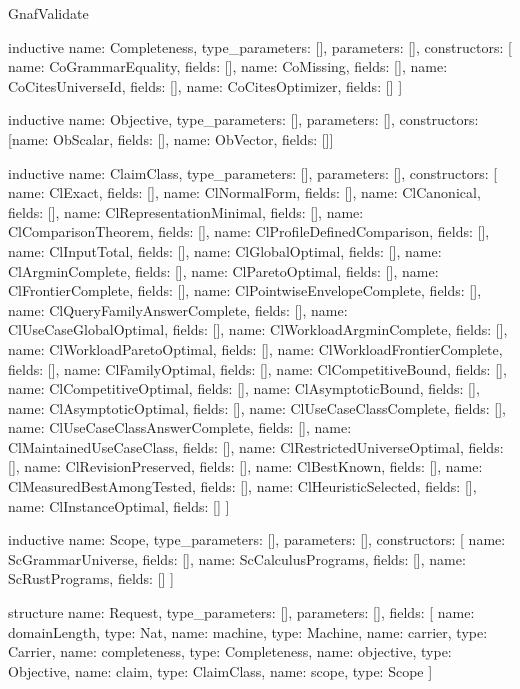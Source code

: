 \begin{lexlean}{GnafValidate}
\begin{semanticmodule}
inductive{
  name: Completeness,
  type_parameters: [],
  parameters: [],
  constructors: [
    {name: CoGrammarEquality, fields: []},
    {name: CoMissing, fields: []},
    {name: CoCitesUniverseId, fields: []},
    {name: CoCitesOptimizer, fields: []}
  ]
}

inductive{
  name: Objective,
  type_parameters: [],
  parameters: [],
  constructors: [{name: ObScalar, fields: []}, {name: ObVector, fields: []}]
}

inductive{
  name: ClaimClass,
  type_parameters: [],
  parameters: [],
  constructors: [
    {name: ClExact, fields: []},
    {name: ClNormalForm, fields: []},
    {name: ClCanonical, fields: []},
    {name: ClRepresentationMinimal, fields: []},
    {name: ClComparisonTheorem, fields: []},
    {name: ClProfileDefinedComparison, fields: []},
    {name: ClInputTotal, fields: []},
    {name: ClGlobalOptimal, fields: []},
    {name: ClArgminComplete, fields: []},
    {name: ClParetoOptimal, fields: []},
    {name: ClFrontierComplete, fields: []},
    {name: ClPointwiseEnvelopeComplete, fields: []},
    {name: ClQueryFamilyAnswerComplete, fields: []},
    {name: ClUseCaseGlobalOptimal, fields: []},
    {name: ClWorkloadArgminComplete, fields: []},
    {name: ClWorkloadParetoOptimal, fields: []},
    {name: ClWorkloadFrontierComplete, fields: []},
    {name: ClFamilyOptimal, fields: []},
    {name: ClCompetitiveBound, fields: []},
    {name: ClCompetitiveOptimal, fields: []},
    {name: ClAsymptoticBound, fields: []},
    {name: ClAsymptoticOptimal, fields: []},
    {name: ClUseCaseClassComplete, fields: []},
    {name: ClUseCaseClassAnswerComplete, fields: []},
    {name: ClMaintainedUseCaseClass, fields: []},
    {name: ClRestrictedUniverseOptimal, fields: []},
    {name: ClRevisionPreserved, fields: []},
    {name: ClBestKnown, fields: []},
    {name: ClMeasuredBestAmongTested, fields: []},
    {name: ClHeuristicSelected, fields: []},
    {name: ClInstanceOptimal, fields: []}
  ]
}

inductive{
  name: Scope,
  type_parameters: [],
  parameters: [],
  constructors: [
    {name: ScGrammarUniverse, fields: []},
    {name: ScCalculusPrograms, fields: []},
    {name: ScRustPrograms, fields: []}
  ]
}

structure{
  name: Request,
  type_parameters: [],
  parameters: [],
  fields: [
    {name: domainLength, type: Nat},
    {name: machine, type: Machine},
    {name: carrier, type: Carrier},
    {name: completeness, type: Completeness},
    {name: objective, type: Objective},
    {name: claim, type: ClaimClass},
    {name: scope, type: Scope}
  ]
}


\end{semanticmodule}
\end{lexlean}
